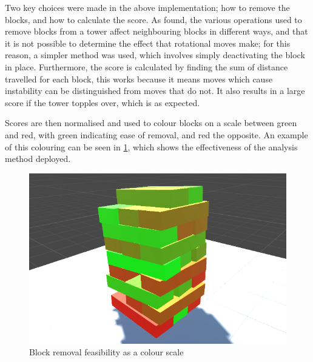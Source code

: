 

Two key choices were made in the above implementation; how to remove the blocks, and how to calculate the score. As \citet{jengaanalysis} found, the various operations used to remove blocks from a tower affect neighbouring blocks in different ways, and that it is not possible to determine the effect that rotational moves make; for this reason, a simpler method was used, which involves simply deactivating the block in place. Furthermore, the score is calculated by finding the sum of distance travelled for each block, this works because it means moves which cause instability can be distinguished from moves that do not. It also results in a large score if the tower topples over, which is as expected.

Scores are then normalised and used to colour blocks on a scale between green and red, with green indicating ease of removal, and red the opposite. An example of this colouring can be seen in \cref{fig:analysisunity}, which shows the effectiveness of the analysis method deployed.

\vfill
\begin{figure}[ht]
    \centering
    \includegraphics[width=\textwidth]{images/implementation/analysis}
    \caption{Block removal feasibility as a colour scale}
    \label{fig:analysisunity}
\end{figure}
\vfill

\section{\display}

